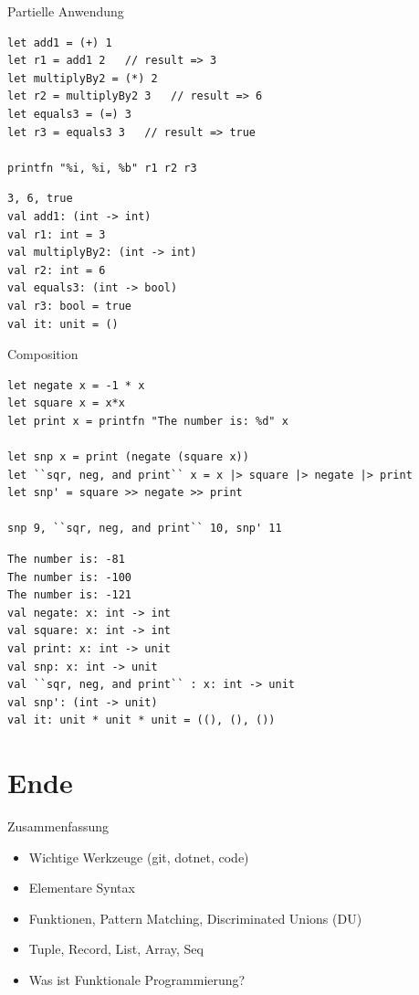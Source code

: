 \documentclass[t]{beamer}
\begin{document}
\begin{frame}[label={sec:org5bd3f27},fragile]{Partielle Anwendung}
 \scriptsize

\begin{verbatim}
let add1 = (+) 1        
let r1 = add1 2   // result => 3
let multiplyBy2 = (*) 2
let r2 = multiplyBy2 3   // result => 6
let equals3 = (=) 3
let r3 = equals3 3   // result => true

printfn "%i, %i, %b" r1 r2 r3
\end{verbatim}

\begin{verbatim}
3, 6, true
val add1: (int -> int)
val r1: int = 3
val multiplyBy2: (int -> int)
val r2: int = 6
val equals3: (int -> bool)
val r3: bool = true
val it: unit = ()
\end{verbatim}
\end{frame}

\begin{frame}[label={sec:org3e8b512},fragile]{Composition}
 \scriptsize

\begin{verbatim}
let negate x = -1 * x
let square x = x*x
let print x = printfn "The number is: %d" x

let snp x = print (negate (square x))
let ``sqr, neg, and print`` x = x |> square |> negate |> print
let snp' = square >> negate >> print

snp 9, ``sqr, neg, and print`` 10, snp' 11
\end{verbatim}

\begin{verbatim}
The number is: -81
The number is: -100
The number is: -121
val negate: x: int -> int
val square: x: int -> int
val print: x: int -> unit
val snp: x: int -> unit
val ``sqr, neg, and print`` : x: int -> unit
val snp': (int -> unit)
val it: unit * unit * unit = ((), (), ())
\end{verbatim}
\end{frame}


\section{Ende }
\label{sec:org1e98753}

\begin{frame}[label={sec:orgfe84010}]{Zusammenfassung}
\begin{itemize}
\item Wichtige Werkzeuge (git, dotnet, code)
\item Elementare Syntax
\item Funktionen, Pattern Matching, Discriminated Unions (DU)
\item Tuple, Record, List, Array, Seq
\item Was ist Funktionale Programmierung?
\end{itemize}
\end{frame}
\end{document}
